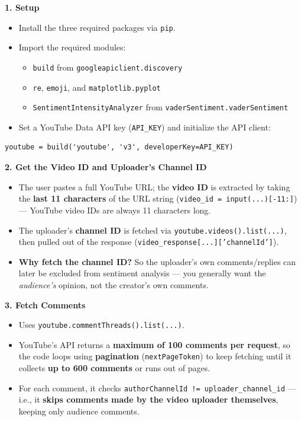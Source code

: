 \documentclass[12pt,openany]{book}
\begin{document}
\textbf{1. Setup}
\begin{itemize}[leftmargin=*]
    \item Install the three required packages via \texttt{pip}.
    \item Import the required modules:
    \begin{itemize}[leftmargin=*,topsep=2pt,itemsep=1pt]
        \item \texttt{build} from \texttt{googleapiclient.discovery}
        \item \texttt{re}, \texttt{emoji}, and \texttt{matplotlib.pyplot}
        \item \texttt{SentimentIntensityAnalyzer} from \texttt{vaderSentiment.vaderSentiment}
    \end{itemize}
    \item Set a YouTube Data API key (\texttt{API\_KEY}) and initialize the API client:
\end{itemize}
\begin{Verbatim}[breaklines=true,breakanywhere=true,fontsize=\small]
  youtube = build('youtube', 'v3', developerKey=API_KEY)
\end{Verbatim}

\textbf{2. Get the Video ID and Uploader's Channel ID}
\begin{itemize}[leftmargin=*]
    \item The user pastes a full YouTube URL; the \textbf{video ID} is extracted by taking the \textbf{last 11 characters} of the URL string (\texttt{video\_id = input(...)[-11:]}) --- YouTube video IDs are always 11 characters long.
    \item The uploader's \textbf{channel ID} is fetched via \texttt{youtube.videos().list(...)}, then pulled out of the response (\texttt{video\_response[...]['channelId']}).
    \item \textbf{Why fetch the channel ID?} So the uploader's own comments/replies can later be excluded from sentiment analysis --- you generally want the \textit{audience's} opinion, not the creator's own comments.
\end{itemize}

\textbf{3. Fetch Comments}
\begin{itemize}[leftmargin=*]
    \item Uses \texttt{youtube.commentThreads().list(...)}.
    \item YouTube's API returns a \textbf{maximum of 100 comments per request}, so the code loops using \textbf{pagination} (\texttt{nextPageToken}) to keep fetching until it collects \textbf{up to 600 comments} or runs out of pages.
    \item For each comment, it checks \texttt{authorChannelId != uploader\_channel\_id} --- i.e., it \textbf{skips comments made by the video uploader themselves}, keeping only audience comments.
\end{itemize}
\end{document}
